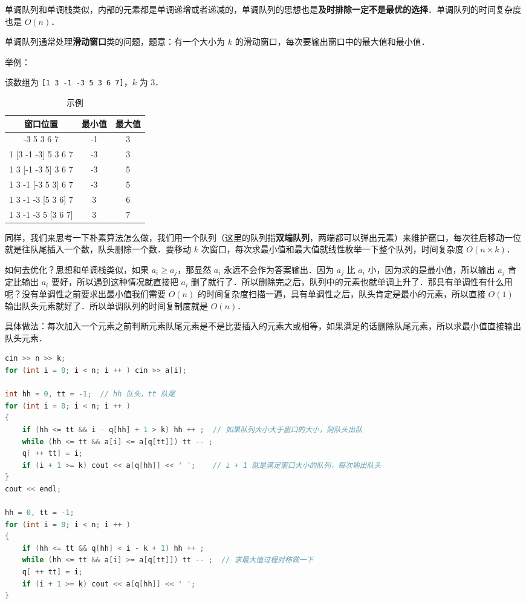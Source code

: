 
单调队列和单调栈类似，内部的元素都是单调递增或者递减的，单调队列的思想也是\textbf{及时排除一定不是最优的选择}．单调队列的时间复杂度也是 $O(n)$．

单调队列通常处理\textbf{滑动窗口}类的问题，题意：有一个大小为 $k$ 的滑动窗口，每次要输出窗口中的最大值和最小值．

举例：

该数组为 \verb|[1 3 -1 -3 5 3 6 7]|，$k$ 为 $3$．

\begin{table}[ht]
\centering
\caption{示例}\label{Mqueue_tab1}
\begin{tabular}{|c|c|c|}
\hline
窗口位置	 & 最小值	 & 最大值 \\
\hline
[1 3 -1] -3 5 3 6 7	 & -1 & 3 \\
\hline
1 [3 -1 -3] 5 3 6 7	 & -3 & 3 \\
\hline
1 3 [-1 -3 5] 3 6 7	 & -3 & 5 \\
\hline
1 3 -1 [-3 5 3] 6 7	 & -3 & 5 \\
\hline
1 3 -1 -3 [5 3 6] 7	 & 3 & 6 \\
\hline
1 3 -1 -3 5 [3 6 7]	 & 3 & 7 \\
\hline
\end{tabular}
\end{table}

同样，我们来思考一下朴素算法怎么做，我们用一个队列（这里的队列指\textbf{双端队列}，两端都可以弹出元素）来维护窗口，每次往后移动一位就是往队尾插入一个数，队头删除一个数．要移动 $k$ 次窗口，每次求最小值和最大值就线性枚举一下整个队列，时间复杂度 $O(n\times k)$．

如何去优化？思想和单调栈类似，如果 $a_i \geqslant a_j$，那显然 $a_i$ 永远不会作为答案输出．因为 $a_j$ 比 $a_i$ 小，因为求的是最小值，所以输出 $a_j$ 肯定比输出 $a_i$ 要好，所以遇到这种情况就直接把 $a_i$ 删了就行了．所以删除完之后，队列中的元素也就单调上升了．那具有单调性有什么用呢？没有单调性之前要求出最小值我们需要 $O(n)$ 的时间复杂度扫描一遍，具有单调性之后，队头肯定是最小的元素，所以直接 $O(1)$ 输出队头元素就好了．所以单调队列的时间复制度就是 $O(n)$．

具体做法：每次加入一个元素之前判断元素队尾元素是不是比要插入的元素大或相等，如果满足的话删除队尾元素，所以求最小值直接输出队头元素．

\begin{lstlisting}[language=cpp]
cin >> n >> k;
for (int i = 0; i < n; i ++ ) cin >> a[i];

int hh = 0, tt = -1;  // hh 队头，tt 队尾
for (int i = 0; i < n; i ++ )
{
    if (hh <= tt && i - q[hh] + 1 > k) hh ++ ;  // 如果队列大小大于窗口的大小，则队头出队
    while (hh <= tt && a[i] <= a[q[tt]]) tt -- ;
    q[ ++ tt] = i;
    if (i + 1 >= k) cout << a[q[hh]] << ' ';    // i + 1 就是满足窗口大小的队列，每次输出队头
}
cout << endl;

hh = 0, tt = -1;
for (int i = 0; i < n; i ++ )
{
    if (hh <= tt && q[hh] < i - k + 1) hh ++ ;
    while (hh <= tt && a[i] >= a[q[tt]]) tt -- ;  // 求最大值过程对称做一下
    q[ ++ tt] = i;
    if (i + 1 >= k) cout << a[q[hh]] << ' ';
}
\end{lstlisting}